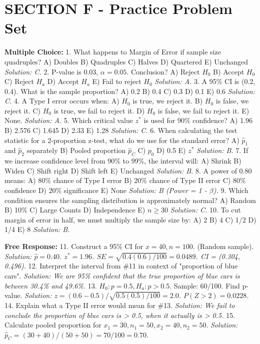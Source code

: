 \section{SECTION F - Practice Problem Set}
\begin{workbookbox}
\textbf{Multiple Choice:}
1. What happens to Margin of Error if sample size quadruples? 
A) Doubles B) Quadruples C) Halves D) Quartered E) Unchanged
\textit{Solution: C.}
2. P-value is 0.03, $\alpha=0.05$. Conclusion? 
A) Reject $H_0$ B) Accept $H_0$ C) Reject $H_a$ D) Accept $H_a$ E) Fail to reject $H_0$
\textit{Solution: A.}
3. A 95\% CI is (0.2, 0.4). What is the sample proportion?
A) 0.2 B) 0.4 C) 0.3 D) 0.1 E) 0.6
\textit{Solution: C.}
4. A Type I error occurs when:
A) $H_0$ is true, we reject it. B) $H_0$ is false, we reject it. C) $H_0$ is true, we fail to reject it. D) $H_0$ is false, we fail to reject it. E) None.
\textit{Solution: A.}
5. Which critical value $z^*$ is used for 90\% confidence?
A) 1.96 B) 2.576 C) 1.645 D) 2.33 E) 1.28
\textit{Solution: C.}
6. When calculating the test statistic for a 2-proportion z-test, what do we use for the standard error?
A) $\hat{p}_1$ and $\hat{p}_2$ separately B) Pooled proportion $\hat{p}_C$ C) $p_0$ D) 0.5 E) $z^*$
\textit{Solution: B.}
7. If we increase confidence level from 90\% to 99\%, the interval will:
A) Shrink B) Widen C) Shift right D) Shift left E) Unchanged
\textit{Solution: B.}
8. A power of 0.80 means:
A) 80\% chance of Type I error B) 20\% chance of Type II error C) 80\% confidence D) 20\% significance E) None
\textit{Solution: B (Power = 1 - $\beta$).}
9. Which condition ensures the sampling distribution is approximately normal?
A) Random B) 10\% C) Large Counts D) Independence E) $n \geq 30$
\textit{Solution: C.}
10. To cut margin of error in half, we must multiply the sample size by:
A) 2 B) 4 C) 1/2 D) 1/4 E) 8
\textit{Solution: B.}

\textbf{Free Response:}
11. Construct a 95\% CI for $x=40, n=100$. (Random sample).
\textit{Solution: $\hat{p}=0.40$. $z^*=1.96$. $SE=\sqrt{0.4(0.6)/100}=0.0489$. CI = (0.304, 0.496).}
12. Interpret the interval from \#11 in context of "proportion of blue cars".
\textit{Solution: We are 95\% confident that the true proportion of blue cars is between 30.4\% and 49.6\%.}
13. $H_0: p=0.5, H_a: p>0.5$. Sample: 60/100. Find p-value.
\textit{Solution: $z=(0.6-0.5)/\sqrt{0.5(0.5)/100} = 2.0$. $P(Z>2) = 0.0228$.}
14. Explain what a Type II error would mean for \#13.
\textit{Solution: We fail to conclude the proportion of blue cars is > 0.5, when it actually is > 0.5.}
15. Calculate pooled proportion for $x_1=30, n_1=50, x_2=40, n_2=50$.
\textit{Solution: $\hat{p}_C = (30+40)/(50+50) = 70/100 = 0.70$.}
\end{workbookbox}

